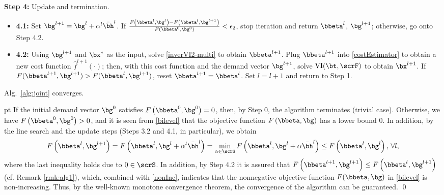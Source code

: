 \documentclass[3p]{elsarticle}
\newcommand{\pf}{\vskip 5 pt \noindent {\bf{Proof: }}}
\begin{document}
\begin{algorithm}
\begin{algorithmic}[1]
			\State \textbf{Step 4:} Update and termination. 
			\begin{itemize}
				\item[] \textbf{4.1:} 
					Set ${\bg ^{l + 1}} = {\bg ^l} + {\alpha ^l}{{\bar \bh}^l}$. If $ < {\epsilon _2}$, stop iteration and return $\bbeta^{l}$, $\bg^{l+1}$; otherwise, go onto Step 4.2.
				\item[] \textbf{4.2:} Using $\bg^{{l+1}}$ and ${\bx^*}$ as the input, solve \eqref{inverVI2-multi} to obtain $\bbeta^{{l+1}}$. Plug $\bbeta^{{l+1}}$ into \eqref{costEstimator} to obtain a new cost function $\hat f^{l+1}(\cdot)$; then, with this cost function and the demand vector $\bg^{{l+1}}$, solve $(\bt,\scrF)$ to obtain $\bx^{{l+1}}$. If $F(\bbeta^{l+1},\bg^{l+1}) > F(\bbeta^l,\bg^{l+1})$, reset $\bbeta^{l+1} = \bbeta^l$. Set $l=l+1$ and return to Step 1.	
			\end{itemize}
	\end{algorithmic}
\end{algorithm}

	
\begin{prop} \label{prop1} Alg.~\ref{alg:joint} converges. \end{prop}
\pf  If the initial demand vector $\bg^{{0}}$ satisfies
    $F\left(\bbeta^0,\bg^{{0}}\right) = 0$, then, by Step 0, the
    algorithm terminates (trivial case). Otherwise, we have
    $F\left(\bbeta^0,\bg^{{0}}\right) > 0$, and it is seen from
    \eqref{bilevel} that the objective function
    $F\left(\bbeta,\bg\right)$ has a lower bound $0$. In addition, by
    the line search and the update steps (Steps 3.2 and 4.1, in
    particular), we obtain
\begin{align} 
F\left(\bbeta^{l}, {{\bg^{l + 1}}} \right) = F\left(\bbeta^l, {{\bg^l} + {\alpha ^l}{{\bar \bh}^l}} \right) = \mathop {\min }\limits_{\alpha  \in \scrS} F\left(\bbeta^l, {{\bg^l} + \alpha {{\bar \bh}^l}} \right) \leq F\left(\bbeta^l, {{\bg^l}} \right), \, \forall l, \label{nonInc}
\end{align}
where the last inequality holds due to $0 \in \scrS$. In addition, by
Step 4.2 it is assured that $F\left(\bbeta^{l+1}, {{\bg^{l + 1}}}
\right) \le F\left(\bbeta^{l}, {{\bg^{l + 1}}} \right) $ (cf. Remark
\ref{rmk:alg1}), which, combined with \eqref{nonInc}, indicates that the
nonnegative objective function $F(\bbeta,\bg)$ in \eqref{bilevel} is
non-increasing. Thus, by the well-known monotone convergence theorem,
the convergence of the algorithm can be guaranteed.
\qed
	
\end{document}
